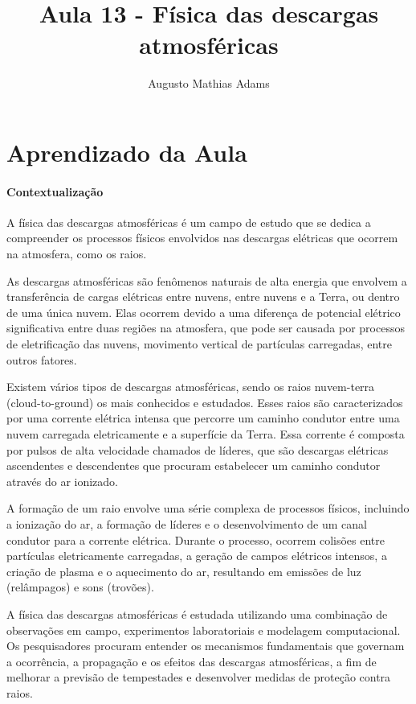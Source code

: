 \documentclass[a4paper, 12pt, onecolumn,singlespacing]{article}
\title{Aula 13 - Física das descargas atmosféricas}
\author[1]{Augusto Mathias Adams}
\affil[1]{augusto.adams@ufpr.br}
\begin{document}
	
	\maketitle
	
	\section{Aprendizado da Aula}
	
	\paragraph{Contextualização} A física das descargas atmosféricas é um campo de estudo que se dedica a compreender os processos físicos envolvidos nas descargas elétricas que ocorrem na atmosfera, como os raios.
	
	As descargas atmosféricas são fenômenos naturais de alta energia que envolvem a transferência de cargas elétricas entre nuvens, entre nuvens e a Terra, ou dentro de uma única nuvem. Elas ocorrem devido a uma diferença de potencial elétrico significativa entre duas regiões na atmosfera, que pode ser causada por processos de eletrificação das nuvens, movimento vertical de partículas carregadas, entre outros fatores.
	
	Existem vários tipos de descargas atmosféricas, sendo os raios nuvem-terra (cloud-to-ground) os mais conhecidos e estudados. Esses raios são caracterizados por uma corrente elétrica intensa que percorre um caminho condutor entre uma nuvem carregada eletricamente e a superfície da Terra. Essa corrente é composta por pulsos de alta velocidade chamados de líderes, que são descargas elétricas ascendentes e descendentes que procuram estabelecer um caminho condutor através do ar ionizado.
	
	A formação de um raio envolve uma série complexa de processos físicos, incluindo a ionização do ar, a formação de líderes e o desenvolvimento de um canal condutor para a corrente elétrica. Durante o processo, ocorrem colisões entre partículas eletricamente carregadas, a geração de campos elétricos intensos, a criação de plasma e o aquecimento do ar, resultando em emissões de luz (relâmpagos) e sons (trovões).
	
	A física das descargas atmosféricas é estudada utilizando uma combinação de observações em campo, experimentos laboratoriais e modelagem computacional. Os pesquisadores procuram entender os mecanismos fundamentais que governam a ocorrência, a propagação e os efeitos das descargas atmosféricas, a fim de melhorar a previsão de tempestades e desenvolver medidas de proteção contra raios.
	
\end{document}
